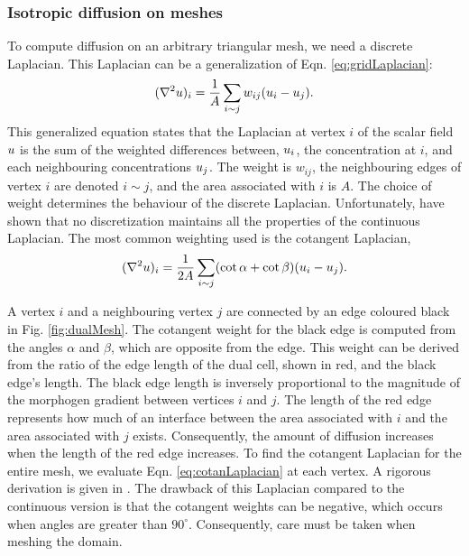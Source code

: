\subsubsection*{Isotropic diffusion on meshes}
To compute diffusion on an arbitrary triangular mesh, we need a discrete Laplacian. This Laplacian can be a generalization of Eqn. \ref{eq:gridLaplacian}:
\begin{equation}
(\nabla^2{} u)_i = \frac{1}{A} \sum_{i \sim j} w_{ij}(u_i - u_j).
\end{equation}
This generalized equation states that the Laplacian at vertex $i$ of the scalar field $u$ is the sum of the weighted differences between, $u_i$, the concentration at $i$, and each neighbouring concentrations $u_j$. The weight is $w_{ij}$, the neighbouring edges of vertex $i$ are denoted $i \sim j$, and the area associated with $i$ is $A$. The choice of weight determines the behaviour of the discrete Laplacian. Unfortunately, \citet{wardetzky2007} have shown that no discretization maintains all the properties of the continuous Laplacian. The most common weighting used is the cotangent Laplacian,
\begin{equation}
	(\nabla^2{} u)_i = \frac{1}{2A} \sum_{i \sim j} (\cot{\alpha} + \cot{\beta)} (u_i - u_j).
	\label{eq:cotanLaplacian}
\end{equation}

A vertex $i$ and a neighbouring vertex $j$ are connected by an edge coloured black in Fig. \ref{fig:dualMesh}. The cotangent weight for the black edge is computed from the angles $\alpha$ and $\beta$, which are opposite from the edge. This weight can be derived from the ratio of the edge length of the dual cell, shown in red, and the black edge's length. The black edge length is inversely proportional to the magnitude of the morphogen gradient between vertices $i$ and $j$. The length of the red edge represents how much of an interface between the area associated with $i$ and the area associated with $j$ exists. Consequently, the amount of diffusion increases when the length of the red edge increases. To find the cotangent Laplacian for the entire mesh, we evaluate Eqn. \ref{eq:cotanLaplacian} at each vertex. A rigorous derivation is given in \citep{crane2013, herholz2013}. The drawback of this Laplacian compared to the continuous version is that the cotangent weights can be negative, which occurs when angles are greater than $90^\circ$. Consequently, care must be taken when meshing the domain.

